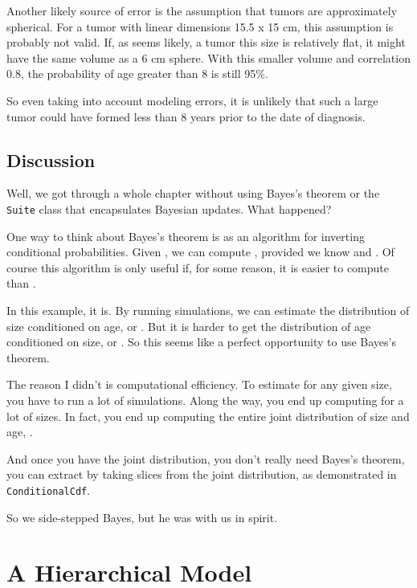 \documentclass[12pt]{book}
\theoremstyle{exercise}
\newcommand{\py}[1]{{\tt #1}}%
\begin{document}
Another likely source of error is the assumption that tumors are
approximately spherical.  For a tumor with linear dimensions 15.5 x 15
cm, this assumption is probably not valid.  If, as seems likely, a
tumor this size
is relatively flat, it might have the same volume as a 6 cm sphere.
With this smaller volume and correlation 0.8, the probability of age
greater than 8 is still 95\%.

So even taking into account modeling errors, it is unlikely that such
a large tumor could have formed less than 8 years prior to the date of
diagnosis.


\section{Discussion}

Well, we got through a whole chapter without using Bayes's theorem or
the \py{Suite} class that encapsulates Bayesian updates.  What
happened?

One way to think about Bayes's theorem is as an algorithm for
inverting conditional probabilities.  Given , we can compute
, provided we know  and .  Of course this algorithm
is only useful if, for some reason, it is easier to compute 
than .

In this example, it is.  By running simulations, we can estimate the
distribution of size conditioned on age, or .  But it is
harder to get the distribution of age conditioned on size, or
.  So this seems like a perfect opportunity to use Bayes's
theorem.

The reason I didn't is computational efficiency.  To estimate
 for any given size, you have to run a lot of simulations.
Along the way, you end up computing  for a lot of sizes.
In fact, you end up computing the entire joint distribution of size
and age, .

And once you have the joint distribution, you don't really need
Bayes's theorem, you can extract  by taking slices from
the joint distribution, as demonstrated in \py{ConditionalCdf}.

So we side-stepped Bayes, but he was with us in spirit.


\chapter{A Hierarchical Model}
\label{hierarchical}
\end{document}

